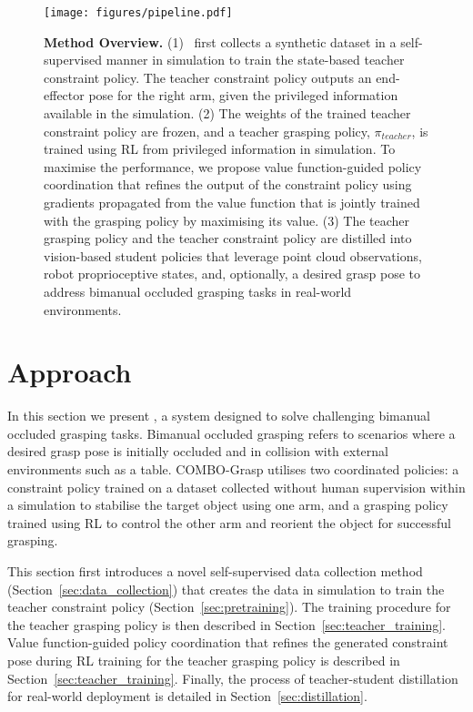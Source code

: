 \begin{figure*}
    \centering
    \texttt{[image: figures/pipeline.pdf]}
    \caption{\textbf{Method Overview.} (1) \ourmethod~first collects a synthetic dataset in a self-supervised manner in simulation to train the state-based teacher constraint policy. The teacher constraint policy outputs an end-effector pose for the right arm, given the privileged information available in the simulation. (2) The weights of the trained teacher constraint policy are frozen, and a teacher grasping policy, $\pi_{teacher}$, is trained using RL from privileged information in simulation. To maximise the performance, we propose value function-guided policy coordination that refines the output of the constraint policy using gradients propagated from the value function that is jointly trained with the grasping policy by maximising its value. (3) The teacher grasping policy and the teacher constraint policy are distilled into vision-based student policies that leverage point cloud observations, robot proprioceptive states, and, optionally, a desired grasp pose to address bimanual occluded grasping tasks in real-world environments.}
    \label{fig:pipeline}
    \vspace{-0.5cm}
\end{figure*}

\section{Approach}
In this section we present \ourmethod, a system designed to solve challenging bimanual occluded grasping tasks.
Bimanual occluded grasping refers to scenarios where a desired grasp pose is initially occluded and in collision with external environments such as a table.
COMBO-Grasp utilises two coordinated policies: a constraint policy trained on a dataset collected without human supervision within a simulation to stabilise the target object using one arm, and a grasping policy trained using RL to control the other arm and reorient the object for successful grasping.

This section first introduces a novel self-supervised data collection method (Section~\ref{sec:data_collection}) that creates the data in simulation to train the teacher constraint policy (Section~\ref{sec:pretraining}). 
The training procedure for the teacher grasping policy is then described in Section~\ref{sec:teacher_training}. 
Value function-guided policy coordination that refines the generated constraint pose during RL training for the teacher grasping policy is described in Section~\ref{sec:teacher_training}. Finally, the process of teacher-student distillation for real-world deployment is detailed in Section~\ref{sec:distillation}.



